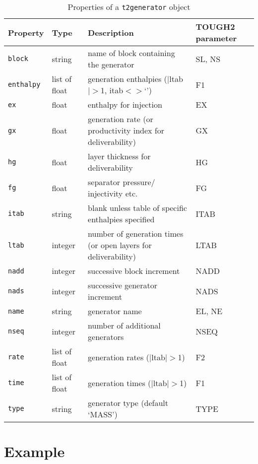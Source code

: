 \begin{table}
  \begin{center}
    \begin{tabular}{|l|l|p{60mm}|p{20mm}|}
      \hline
      \textbf{Property} & \textbf{Type} & \textbf{Description} & \textbf{TOUGH2 parameter}\\
      \hline
      \texttt{block} & string & name of block containing the generator & SL, NS\\
      \texttt{enthalpy} & list of float & generation enthalpies ($|$ltab$|>$1, itab$<>$`')& F1\\
      \texttt{ex} & float & enthalpy for injection & EX\\
      \texttt{gx} & float & generation rate (or productivity index for deliverability) & GX\\
      \texttt{hg} & float & layer thickness for deliverability & HG\\
      \texttt{fg} & float & separator pressure/ injectivity etc. & FG\\
      \texttt{itab} & string & blank unless table of specific enthalpies specified & ITAB\\
      \texttt{ltab} & integer & number of generation times (or open layers for deliverability) & LTAB\\
      \texttt{nadd} & integer & successive block increment & NADD\\
      \texttt{nads} & integer & successive generator increment & NADS\\
      \texttt{name} & string & generator name & EL, NE\\
      \texttt{nseq} & integer & number of additional generators & NSEQ\\
      \texttt{rate} & list of float & generation rates ($|$ltab$|>$1)& F2\\
      \texttt{time} & list of float & generation times ($|$ltab$|>$1)& F1\\
      \texttt{type} & string & generator type (default `MASS') & TYPE\\
      \hline
    \end{tabular}
    \caption{Properties of a \texttt{t2generator} object}
    \label{tb:t2generator_properties}
  \end{center}
\end{table}

\section{Example}

